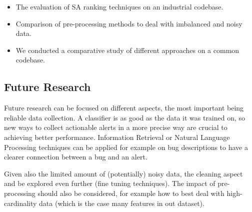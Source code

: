 \begin{itemize}
\item The evaluation of SA ranking techniques on an industrial codebase. 
\item Comparison of pre-processing methods to deal with imbalanced and noisy data.
\item We conducted a comparative study of different approaches on a common codebase.

\end{itemize}




\subsection{Future Research}


Future research can be focused on different aspects, the most important being reliable data collection. A classifier is as good as the data it was trained on, so new ways to collect actionable alerts in a more precise way are crucial to achieving better performance. Information Retrieval or Natural Language Processing techniques can be applied for example on bug descriptions to have a clearer connection between a bug and an alert.

Given also the limited amount of (potentially) noisy data, the cleaning aspect and be explored even further (fine tuning techniques). The impact of pre-processing should also be considered, for example how to best deal with high-cardinality data (which is the case many features in out dataset).

